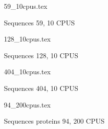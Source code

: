 \documentclass[12pt,a4paper]{article}
\begin{document}
\begin{figure}
\caption*{Sequences 59, 10 CPUS}
{59_10cpus.tex}
\end{figure}

\begin{figure}
\caption*{Sequences 128, 10 CPUS}
{128_10cpus.tex}
\end{figure}

\begin{figure}
\caption*{Sequences 404, 10 CPUS}
{404_10cpus.tex}
\end{figure}

\begin{figure}
\caption*{Sequences proteins 94, 200 CPUS}
{94_200cpus.tex}
\end{figure}
\end{document}
